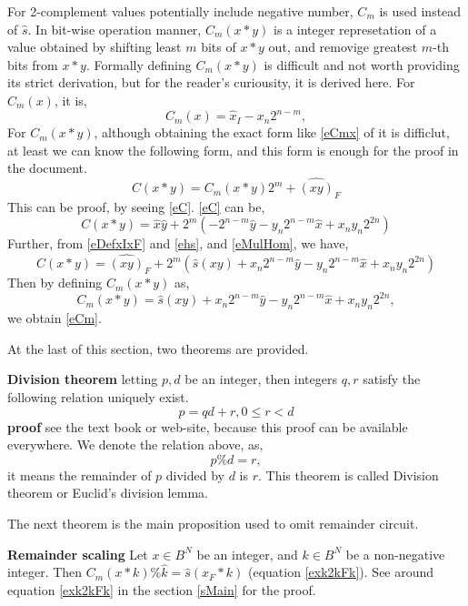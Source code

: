 \documentclass[a4paper]{article}
\newcommand{\eqlabel}[1]{\label{#1}
}
\newcommand{\br}[1]{\left(#1\right)}
\newcommand{\hx}{{\hat{x}}}
\newcommand{\hy}{{\hat{y}}}
\newcommand{\hk}{{\hat{k}}}
\newcommand{\hs}{{\hat{s}}}
\begin{document}
For 2-complement values potentially include negative number, \(C_m\) is used instead of \(\hs\). In bit-wise operation manner, \(C_m(x*y)\) is a integer represetation of a value obtained by shifting least \(m\) bits of \(x*y\) out, and removige greatest \(m\)-th bits from \(x*y\). Formally defining \( C_m(x*y)\) is difficult and not worth providing its strict derivation, but for the reader's curiousity, it is derived here. For \(C_m(x)\), it is,
\begin{equation}
	\eqlabel{eCmx}
    C_m(x) = \hx_I - x_{n} 2^{n-m},
\end{equation} 
For \(C_m(x*y)\), although obtaining the exact form like \eqref{eCmx} of it is difficlut, at least we can know the following form, and this form is enough for the proof in the document.
\begin{equation}
\eqlabel{eCm}
C(x*y) = C_m(x*y) 2^m + \hat{(xy)}_F
\end{equation}
This can be proof, by seeing \eqref{eC}. \eqref{eC} can be,
\[
   C(x*y) = \hx\hy + 2^m\br{-2^{n-m} \hy - y_n 2^{n-m}\hx + x_ny_n 2^{2n}} 
\]
Further, from \eqref{eDefxIxF} and \eqref{ehs}, and \eqref{eMulHom}, we have,
\[
   C(x*y) =  \hat{(xy)}_F + 2^m\br{\hs(xy) +  x_n2^{n-m} \hy - y_n 2^{n-m}\hx + x_ny_n 2^{2n}}
\]
Then by defining \(C_m(x*y)\) as,
\[
C_m(x*y) =  \hs(xy) +  x_n2^{n-m} \hy - y_n 2^{n-m}\hx + x_ny_n 2^{2n},
\]
we obtain \eqref{eCm}.

At the last of this section, two theorems are provided.

\textbf{Division theorem} letting \(p, d\) be an integer, then integers \(q, r\) satisfy the following relation uniquely exist.
\begin{equation}
    \eqlabel{eRemainder}
    p = qd + r, 0\leq r < d
\end{equation}
\textbf{proof} see the text book or web-site, because this proof can be available everywhere. We denote the relation above, as,
\begin{equation}
    p\% d = r,
\end{equation}
it means the remainder of \(p\) divided by \(d\)  is \(r\). This theorem is called Division theorem or Euclid's division lemma.

The next theorem is the main proposition used to omit remainder circuit.

\textbf{Remainder scaling} Let \(x\in B^N\) be an integer, and \(k\in B^N\) be a non-negative integer. Then \(C_m(x*k)\% \hk = \hs(x_F * k)\) (equation \eqref{exk2kFk}). See around equation \eqref{exk2kFk} in the section \ref{sMain} for the proof.
\end{document}
